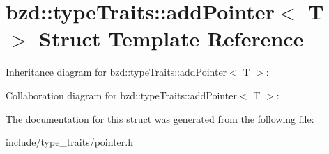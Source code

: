 \hypertarget{structbzd_1_1typeTraits_1_1addPointer}{}\section{bzd\+:\+:type\+Traits\+:\+:add\+Pointer$<$ T $>$ Struct Template Reference}
\label{structbzd_1_1typeTraits_1_1addPointer}


Inheritance diagram for bzd\+:\+:type\+Traits\+:\+:add\+Pointer$<$ T $>$\+:


Collaboration diagram for bzd\+:\+:type\+Traits\+:\+:add\+Pointer$<$ T $>$\+:


The documentation for this struct was generated from the following file\+:\begin{DoxyCompactItemize}
\item 
include/type\+\_\+traits/pointer.\+h\end{DoxyCompactItemize}
